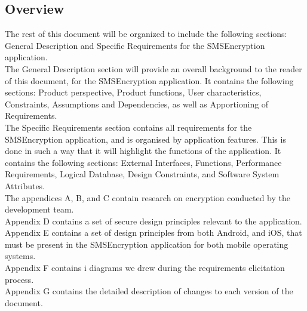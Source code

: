 \subsection{Overview}
The rest of this document will be organized to include the following sections: General Description and Specific Requirements for the SMSEncryption application.
\vspace{10pt}\\
The General Description section will provide an overall background to the reader of this document, for the SMSEncryption application. It contains the following sections: Product perspective, Product functions, User characteristics, Constraints,  Assumptions and Dependencies, as well as Apportioning of Requirements.
\vspace{10pt}\\
The Specific Requirements section contains all requirements for the SMSEncryption application, and is organised by application features. This is done in such a way that it will highlight the functions of the application. It contains the following sections: External Interfaces, Functions, Performance Requirements, Logical Database, Design Constraints, and Software System Attributes.
\vspace{10pt}\\
The appendices A, B, and C contain research on encryption conducted by the development team.
\vspace{10pt}\\
Appendix D contains a set of secure design principles relevant to the application.
\vspace{10pt}\\
Appendix E contains a set of design principles from both Android, and iOS, that must be present in the SMSEncryption application for both mobile operating systems.
\vspace{10pt}\\
Appendix F contains i\text{*} diagrams we drew during the requirements elicitation process.
\vspace{10pt}\\
Appendix G contains the detailed description of changes to each version of the document.